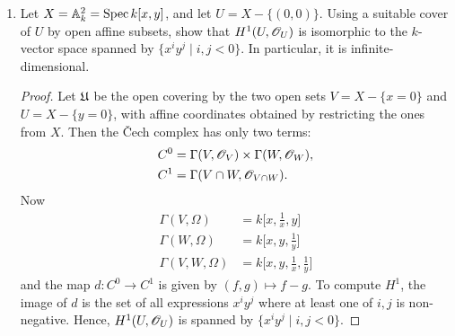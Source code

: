 \documentclass{article}
\begin{document}
\begin{enumerate} [label=\textbf{\arabic*.}, leftmargin=0em]
\begin{proof} $ $ \vspace{0pt}
\begin{enumerate} [label=(\alph*), leftmargin=0cm]

\item The question is local on $Y$, so assume $Y = \spec{A}$ for some Noetherian ring $A$.
Let $K = \Frac(A)$ and $L = \Frac(B)$.
Then $X = \spec{B}$ for some $A$-algebra $B$, where $B$ is finitely generated as an $A$-module.
Since the image of $f$ is dense in $Y$, and $Y$ is integral, hence reduced, the structure homomorphism $A \to B$ is injective.
In particular, $K \subseteq L$.
We want to find a finitely generated $B$ module $M$ such that $M \otimes_B L$ is a finite-dimensional $K$-vectorspace.
But $L/K$ is a finite extension since $B$ is a finite $A$-module.

\item

\end{enumerate}
\end{proof}

\item Let $X = \mathbb{A}_k^2 = \operatorname{Spec}{k[x, y]}$, and let $U = X - \{ (0, 0) \}$.
Using a suitable cover of $U$ by open affine subsets, show that $H^1(U, \mathscr{O}_U)$ is isomorphic to the $k$-vector space spanned by $\{ x^i y^j \mid i, j < 0 \}$.
In particular, it is infinite-dimensional.

\begin{proof}
  Let $\mathfrak{U}$ be the open covering by the two open sets $V = X - \{ x = 0 \}$ and $U = X - \{ y = 0 \}$, with affine coordinates obtained by restricting the ones from $X$.
  Then the Čech complex has only two terms:
  \begin{align*}
    C^0 & = \Gamma(V, \mathscr{O}_V) \times \Gamma(W, \mathscr{O}_W), \\
    C^1 & = \Gamma(V \cap W, \mathscr{O}_{V \cap W}).
  \end{align*}
  Now
  \begin{align*}
    \Gamma(V, \Omega) & = k\bigg[ x, \frac{1}{x}, y \bigg] \\
    \Gamma(W, \Omega) & = k\bigg[ x, y, \frac{1}{y}\bigg] \\
    \Gamma(V, W, \Omega) & = k\bigg[ x, y, \frac{1}{x}, \frac{1}{y} \bigg] 
  \end{align*}
  and the map $d : C^0 \to C^1$ is given by $(f, g) \mapsto f - g$. To compute $H^1$, the image of $d$ is the set of all expressions $x^i y^j$ where at least one of $i, j$ is non-negative. Hence, $H^1(U, \mathscr{O}_U)$ is spanned by $\{ x^iy^j \mid i, j < 0 \}$.
\end{proof}


\end{enumerate}
\end{document}
